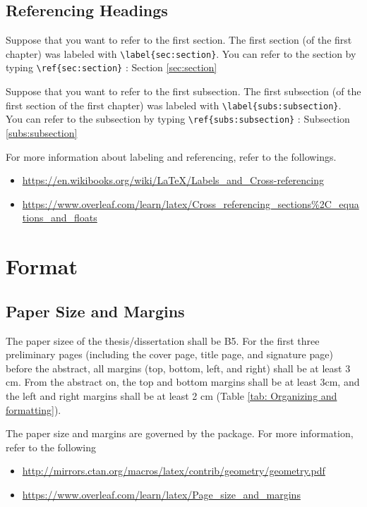 %
\section{Referencing Headings}\label{sec:referencing}
Suppose that you want to refer to the first section.
The first section (of the first chapter) was labeled with \verb|\label{sec:section}|.
You can refer to the section by typing \verb|\ref{sec:section}| : Section \ref{sec:section}

Suppose that you want to refer to the first subsection.
The first subsection (of the first section of the first chapter) was labeled with \verb|\label{subs:subsection}|.
You can refer to the subsection by typing \verb|\ref{subs:subsection}| : Subsection \ref{subs:subsection}

For more information about labeling and referencing, refer to the followings.
\begin{itemize}
\item
\url{https://en.wikibooks.org/wiki/LaTeX/Labels_and_Cross-referencing}
\item
\url{https://www.overleaf.com/learn/latex/Cross_referencing_sections%2C_equations_and_floats}
\end{itemize}

\chapter{Format}\label{chap:organizing}

\section{Paper Size and Margins} \label{sec:papersize}
The paper sizee of the thesis/dissertation shall be B5.
For the first three preliminary pages (including the cover page, title page, and signature page) before the abstract, all margins (top, bottom, left, and right) shall be at least 3 cm.
From the abstract on, the top and bottom margins shall be at least 3cm, and the left and right margins shall be at least 2 cm (Table \ref{tab: Organizing and formatting}).
\bigskip

The paper size and margins are governed by the  package.
For more information, refer to the following
\begin{itemize}
\item
\url{http://mirrors.ctan.org/macros/latex/contrib/geometry/geometry.pdf}
\item
\url{https://www.overleaf.com/learn/latex/Page_size_and_margins}
\end{itemize}

